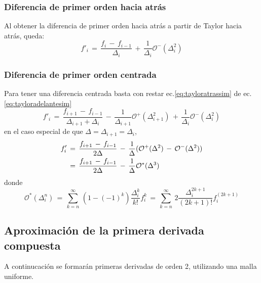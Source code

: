 \documentclass[9pt,technote,twoside,letterpaper,onecolumn]{IEEEtran}
\begin{document}
\subsubsection{Diferencia de primer orden hacia atrás}
\label{sec:dif1Db}
Al obtener la diferencia de primer orden hacia atrás a partir de Taylor hacia atrás, queda: 
\begin{equation}
  f'_i\,=\,\frac{f_i\,-\,f_{i-1}}{\Delta_i}\,+\,\frac{1}{\Delta_i}\mathcal{O}^-(\Delta^2_i)
  \label{eq:apprx1dO2b}
\end{equation}

\subsubsection{Diferencia de primer orden centrada}
\label{sec:dif1Dc}
 Para tener una diferencia centrada basta con restar ec.\ref{eq:tayloratrassim} de ec.\ref{eq:tayloradelantesim}
\begin{equation}
  f'_i\,=\,\frac{f_{i+1}\,-\,f_{i-1}}{\Delta_{i+1}+\Delta_i}\,-\,\frac{1}{\Delta_{i+1}}\mathcal{O}^+(\Delta^2_{i+1})\,+\,\frac{1}{\Delta_i}\mathcal{O}^-(\Delta^2_i)
  \label{eq:apprx1dO2c}
\end{equation}
en el caso especial de que $\Delta=\Delta_{i+1}=\Delta_i$,
\begin{align}
  f'_i&\,=\,\frac{f_{i+1}\,-\,f_{i-1}}{2\Delta}\,-\,\frac{1}{\Delta}(\mathcal{O}^+(\Delta^2)\,-\,\mathcal{O}^-(\Delta^2))\notag\\
  &\,=\,\frac{f_{i+1}\,-\,f_{i-1}}{2\Delta}\,-\,\frac{1}{\Delta}\mathcal{O}^*(\Delta^3)
  \label{eq:apprx1dO2cEq}
\end{align}
donde 
\[
\mathcal{O}^*(\Delta^n_{i})\,=\,\sum^\infty_{k=n}\,(1-(-1)^k)\frac{\Delta^k_i}{k!}f^{k}_i\,=\,\sum^\infty_{k=n}\,2\frac{\Delta^{2k+1}_i}{(2k+1)!}f^{(2k+1)}_i
\]

\subsection{Aproximación de la primera derivada compuesta}
\label{sec:primdercompu}
A continucación se formarán primeras derivadas de orden 2, utilizando una malla uniforme.
\end{document}
